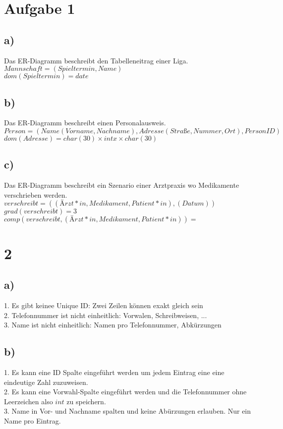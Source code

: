 \documentclass[a4paper]{article}
\begin{document}
\section*{Aufgabe 1}
\subsection*{a)}

Das ER-Diagramm beschreibt den Tabelleneitrag einer Liga.\\
$Mannschaft = ({{Spieltermin}}, {Name})$\\
$dom(Spieltermin) = date$

\subsection*{b)}

Das ER-Diagramm beschreibt einen Personalausweis.\\
$Person = ({Name(Vorname, Nachname), Adresse(Straße, Nummer, Ort)}, {PersonID})$\\
$dom(Adresse) = char(30) \times int x\times char(30)$

\subsection*{c)}

Das ER-Diagramm beschreibt ein Szenario einer Arztpraxis wo Medikamente verschrieben werden.\\
$verschreibt = ((Ärzt*in, Medikament, Patient*in), (Datum))$\\
$grad(verschreibt) = 3$\\
$comp(verschreibt, (Ärzt*in, Medikament, Patient*in)) = $

\section*{2}
\subsection*{a)}
1. Es gibt keinee Unique ID: Zwei Zeilen können exakt gleich sein\\
2. Telefonnummer ist nicht einheitlich: Vorwalen, Schreibweisen, ...\\
3. Name ist nicht einheitlich: Namen pro Telefonnummer, Abkürzungen
\subsection*{b)}
1. Es kann eine ID Spalte eingeführt werden um jedem Eintrag eine eine eindeutige Zahl zuzuweisen.\\
2. Es kann eine Vorwahl-Spalte eingeführt werden und die Telefonnummer ohne Leerzeichen also $int$ zu speichern.\\
3. Name in Vor- und Nachname spalten und keine Abürzungen erlauben. Nur ein Name pro Eintrag.
\end{document}
